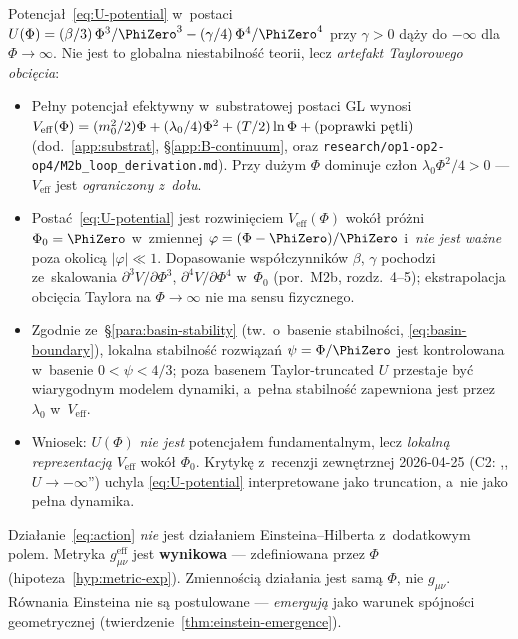 \begin{remark}
\label{rem:U-validity-domain}
Potencja\l{}~\eqref{eq:U-potential} w~postaci
$U(\Phi) = (\beta/3)\,\Phi^3/\PhiZero^3
- (\gamma/4)\,\Phi^4/\PhiZero^4$ przy $\gamma > 0$
d\k{a}\.zy do $-\infty$ dla $\Phi \to \infty$. Nie jest to
globalna niestabilno\'s\'c teorii, lecz \emph{artefakt Taylorowego
obci\k{e}cia}:
\begin{itemize}[nosep]
  \item Pe\l{}ny potencja\l{} efektywny w~substratowej postaci
    GL wynosi $V_{\mathrm{eff}}(\Phi) = (m_0^2/2)\Phi + (\lambda_0/4)\Phi^2
    + (T/2)\ln\Phi + \text{(poprawki p\k{e}tli)}$
    (dod.~\ref{app:substrat}, \S\ref{app:B-continuum},
    oraz \texttt{research/op1-op2-op4/M2b\_loop\_derivation.md}).
    Przy du\.zym $\Phi$ dominuje cz\l{}on $\lambda_0 \Phi^2/4 > 0$ ---
    $V_{\mathrm{eff}}$ jest \emph{ograniczony z~do\l{}u}.
  \item Posta\'c~\eqref{eq:U-potential} jest rozwini\k{e}ciem
    $V_{\mathrm{eff}}(\Phi)$ wok\'o\l{} pr\'o\.zni $\Phi_0 = \PhiZero$
    w~zmiennej $\varphi = (\Phi - \PhiZero)/\PhiZero$
    i~\emph{nie jest wa\.zne} poza okolic\k{a} $|\varphi| \ll 1$.
    Dopasowanie wsp\'o\l{}czynnik\'ow $\beta$, $\gamma$ pochodzi
    ze~skalowania $\partial^3 V/\partial\Phi^3$, $\partial^4 V/\partial\Phi^4$
    w~$\Phi_0$ (por.~M2b, rozdz.~4--5); ekstrapola\-cja
    obci\k{e}cia Taylora na $\Phi \to \infty$ nie ma sensu
    fizycznego.
  \item Zgodnie ze~\S\ref{para:basin-stability} (tw.~o~basenie
    stabilno\'sci, \eqref{eq:basin-boundary}), lokalna
    stabilno\'s\'c rozwi\k{a}za\'n $\psi = \Phi/\PhiZero$
    jest kontrolowana w~basenie $0 < \psi < 4/3$; poza
    basenem Taylor-truncated $U$ przestaje by\'c
    wiarygodnym modelem dynamiki, a~pe\l{}na stabilno\'s\'c
    zapewniona jest przez $\lambda_0$ w~$V_{\mathrm{eff}}$.
  \item Wniosek: $U(\Phi)$ \emph{nie jest} potencja\l{}em
    fundamentalnym, lecz \emph{lokaln\k{a} reprezentacj\k{a}}
    $V_{\mathrm{eff}}$ wok\'o\l{} $\Phi_0$. Krytyk\k{e} z~recenzji
    zewn\k{e}trznej 2026-04-25 (C2: ,,$U \to -\infty$'') uchyla
    \eqref{eq:U-potential} interpretowane jako truncation,
    a~nie jako pe\l{}na dynamika.
\end{itemize}
\end{remark}

\begin{remark}
Dzia\l{}anie~\eqref{eq:action} \emph{nie} jest dzia\l{}aniem
Einsteina--Hilberta z~dodatkowym polem. Metryka
$g_{\mu\nu}^{\mathrm{eff}}$ jest \textbf{wynikowa} ---
zdefiniowana przez $\Phi$ (hipoteza~\ref{hyp:metric-exp}).
Zmienno\'sci\k{a} dzia\l{}ania jest sam\k{a} $\Phi$, nie $g_{\mu\nu}$.
R\'ownania Einsteina nie s\k{a} postulowane --- \emph{emerguj\k{a}}
jako warunek sp\'ojno\'sci geometrycznej
(twierdzenie~\ref{thm:einstein-emergence}).
\end{remark}

